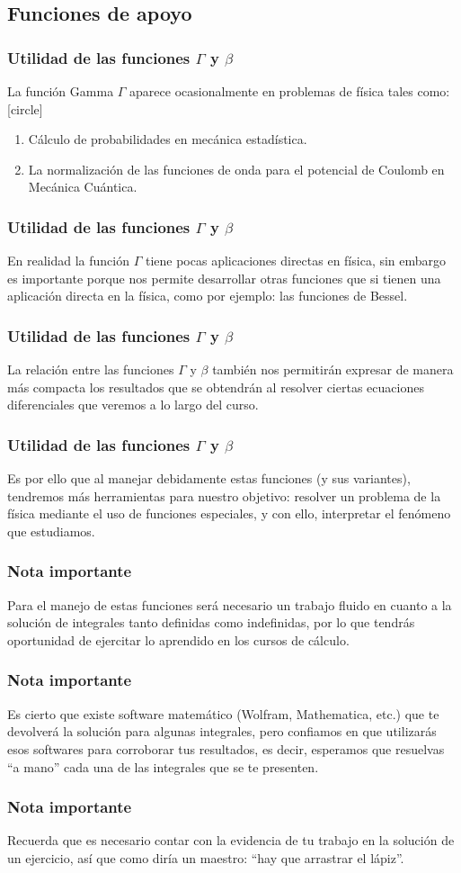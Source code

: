 \subsection{Funciones de apoyo}
\begin{frame}
\frametitle{Utilidad de las funciones $\Gamma$ y $\beta$}
La función Gamma $\Gamma$ aparece ocasionalmente en problemas de física tales como:
[circle]
\begin{enumerate}[<+->]
\item Cálculo de probabilidades en mecánica estadística.
\item La normalización de las funciones de onda para el potencial de Coulomb en Mecánica Cuántica.
\end{enumerate}
\end{frame}
\begin{frame}
\frametitle{Utilidad de las funciones $\Gamma$ y $\beta$}
En realidad la función $\Gamma$ tiene pocas aplicaciones directas en física, sin embargo es importante porque nos permite desarrollar otras funciones que si tienen una aplicación directa en la física, como por ejemplo: las funciones de Bessel.
\end{frame}
\begin{frame}
\frametitle{Utilidad de las funciones $\Gamma$ y $\beta$}
La relación entre las funciones $\Gamma$ y $\beta$ también nos permitirán expresar de manera más compacta los resultados que se obtendrán al resolver ciertas ecuaciones diferenciales que veremos a lo largo del curso.
\end{frame}
\begin{frame}
\frametitle{Utilidad de las funciones $\Gamma$ y $\beta$}
Es por ello que al manejar debidamente estas funciones (y sus variantes), tendremos más herramientas para nuestro objetivo: resolver un problema de la física mediante el uso de funciones especiales, y con ello, interpretar el fenómeno que estudiamos.
\end{frame}
\begin{frame}
\frametitle{Nota importante}
Para el manejo de estas funciones será necesario un trabajo fluido en cuanto a la solución de integrales tanto definidas como indefinidas, por lo que tendrás oportunidad de ejercitar lo aprendido en los cursos de cálculo.
\end{frame}
\begin{frame}
\frametitle{Nota importante}
Es cierto que existe software matemático (Wolfram, Mathematica, etc.) que te devolverá la solución para algunas integrales, pero confiamos en que utilizarás esos softwares para corroborar tus resultados, es decir, esperamos que resuelvas \enquote{a mano} cada una de las integrales que se te presenten.
\end{frame}
\begin{frame}
\frametitle{Nota importante}
Recuerda que es necesario contar con la evidencia de tu trabajo en la solución de un ejercicio, así que como diría un maestro: \enquote{hay que arrastrar el lápiz}.
\end{frame}
